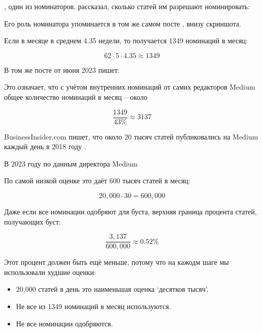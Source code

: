 
\MrMcCarty, один из номинаторов, рассказал, сколько статей им разрешают номинировать:


Его роль номинатора упоминается в том же самом посте \MrsStallingsT
{}, внизу скриншота.

Если в месяце в среднем 4.35 недели, то получается 1349 номинаций в месяц:

\[
    62 \cdot 5 \cdot 4.35 \approx 1349
\]

В том же посте от июня 2023 \MrsStallings пишет:


Это означает, что с учётом внутренних номинаций от самих редакторов Medium
общее количество номинаций в месяц -- около

\[
    \frac{1349}{43\%} \approx 3137
\]

BusinessInsider.com пишет,
что около 20 тысяч статей публиковались на Medium каждый день в 2018 году .

В 2023 году по данным директора Medium


По самой низкой оценке это даёт 600 тысяч статей в месяц:

\[
    20,000 \cdot 30 = 600,000
\]

Даже если все номинации одобряют для буста, верхняя граница процента статей, получающих буст:

\[
    \frac{3,137}{600,000} \approx 0.52\%
\]

Этот процент должен быть ещё меньше, потому что на кажодм шаге мы использовали худшие оценки:

\begin{itemize}
    \item 20,000 статей в день это наименьшая оценка `десятков тысяч'.
    \item Не все из 1349 номинаций в месяц используются.
    \item Не все номинации одобряются.
\end{itemize}

